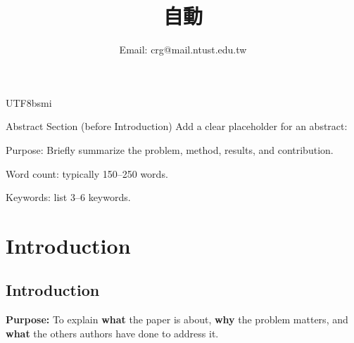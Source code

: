 \documentclass[conference]{IEEEtran}
\begin{document}
\begin{CJK}{UTF8}{bsmi}
\title{自動}
\author{
\author{
  Email: crg@mail.ntust.edu.tw
}

}

\maketitle

Abstract Section (before Introduction)
Add a clear placeholder for an abstract:

Purpose: Briefly summarize the problem, method, results, and contribution.

Word count: typically 150–250 words.

Keywords: list 3–6 keywords.

\section{Introduction}
\subsection{Introduction}
{\bf Purpose:} To explain {\bf what} the paper is about, {\bf why} the problem matters, and {\bf what} the others authors have done to address it.


\end{CJK}
\end{document}

